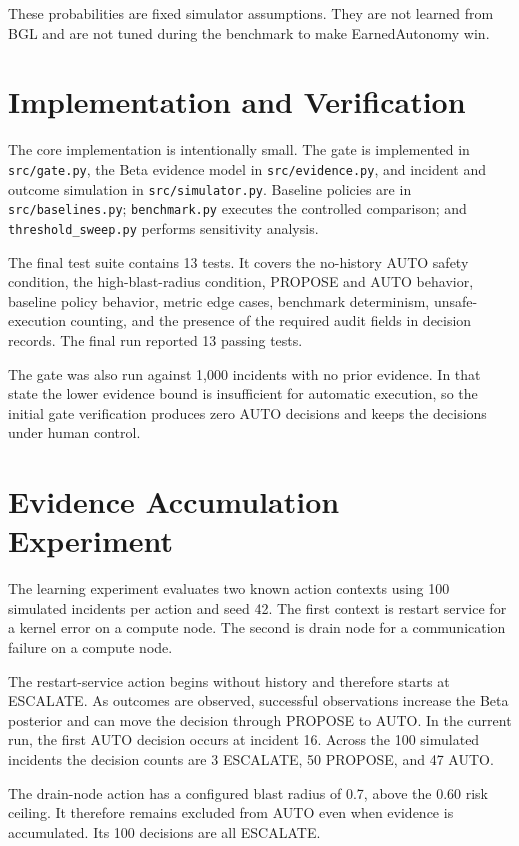 \documentclass[conference]{IEEEtran}
\begin{document}
These probabilities are fixed simulator assumptions. They are not learned from
BGL and are not tuned during the benchmark to make EarnedAutonomy win.

\section{Implementation and Verification}
The core implementation is intentionally small. The gate is implemented in
\texttt{src/gate.py}, the Beta evidence model in \texttt{src/evidence.py}, and
incident and outcome simulation in \texttt{src/simulator.py}. Baseline policies
are in \texttt{src/baselines.py}; \texttt{benchmark.py} executes the controlled
comparison; and \texttt{threshold\_sweep.py} performs sensitivity analysis.

The final test suite contains 13 tests. It covers the no-history AUTO safety
condition, the high-blast-radius condition, PROPOSE and AUTO behavior, baseline
policy behavior, metric edge cases, benchmark determinism, unsafe-execution
counting, and the presence of the required audit fields in decision records.
The final run reported 13 passing tests.

The gate was also run against 1,000 incidents with no prior evidence. In that
state the lower evidence bound is insufficient for automatic execution, so the
initial gate verification produces zero AUTO decisions and keeps the decisions
under human control.

\section{Evidence Accumulation Experiment}
The learning experiment evaluates two known action contexts using 100 simulated
incidents per action and seed 42. The first context is restart service for a
kernel error on a compute node. The second is drain node for a communication
failure on a compute node.

The restart-service action begins without history and therefore starts at
ESCALATE. As outcomes are observed, successful observations increase the Beta
posterior and can move the decision through PROPOSE to AUTO. In the current
run, the first AUTO decision occurs at incident 16. Across the 100 simulated
incidents the decision counts are 3 ESCALATE, 50 PROPOSE, and 47 AUTO.

The drain-node action has a configured blast radius of 0.7, above the 0.60
risk ceiling. It therefore remains excluded from AUTO even when evidence is
accumulated. Its 100 decisions are all ESCALATE.
\end{document}
